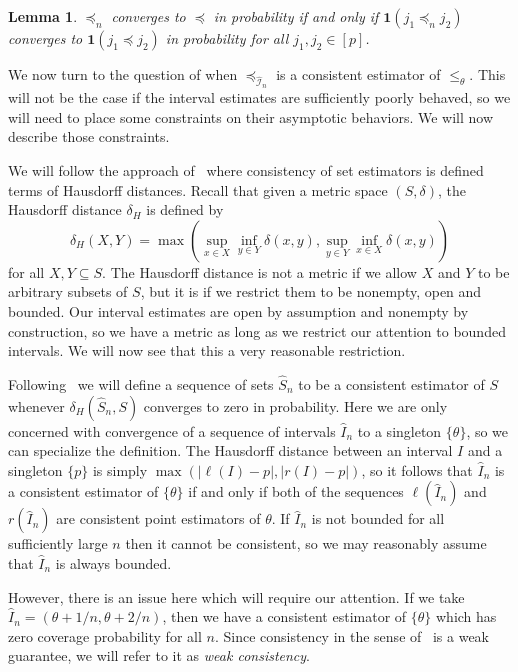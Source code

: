 \documentclass[12pt]{article}
\newcommand{\ind}[1]{\mathbf{1}(#1)}
\newcommand{\pord}{{\leqslant_{\theta}}}
\newcommand{\iordn}{{\preceq_{\hat{\mathcal{I}}_{n}}}}
\numberwithin{theorem}{section}
\newtheorem{lemma}[theorem]{Lemma}
\begin{document}
\begin{lemma}
\label{lem_ind_consist}
$\preceq_n$ converges to $\preceq$ in probability if and only if $\ind{j_1 \preceq_n j_2}$ converges to $\ind{j_1 \preceq j_2}$ in probability for all $j_1, j_2 \in [p]$.
\end{lemma}

We now turn to the question of when $\iordn$ is a consistent estimator of $\pord$.  This will not be the case if the interval estimates are sufficiently poorly behaved, so we will need to place some constraints on their asymptotic behaviors.  We will now describe those constraints.

We will follow the approach of~\cite{chernozhukov2007estimation} where consistency of set estimators is defined terms of Hausdorff distances.  Recall that given a metric space $(S, \delta)$, the Hausdorff distance $\delta_H$ is defined by \[\delta_H(X, Y) = \max\left(\sup_{x \in X} \inf_{y \in Y}\delta(x, y), \sup_{y \in Y} \inf_{x \in X}\delta(x, y)\right)\] for all $X, Y \subseteq S$.  The Hausdorff distance is not a metric if we allow $X$ and $Y$ to be arbitrary subsets of $S$, but it is if we restrict them to be nonempty, open and bounded.  Our interval estimates are open by assumption and nonempty by construction, so we have a metric as long as we restrict our attention to bounded intervals.  We will now see that this a very reasonable restriction.

Following~\cite{chernozhukov2007estimation} we will define a sequence of sets $\hat{S}_n$ to be a consistent estimator of $S$ whenever $\delta_H(\hat{S}_n, S)$ converges to zero in probability.  Here we are only concerned with convergence of a sequence of intervals $\hat{I}_n$ to a singleton $\{\theta\}$, so we can specialize the definition.  The Hausdorff distance between an interval $I$ and a singleton $\{p\}$ is simply $\max(|\ell(I) - p|, |r(I) - p|)$, so it follows that $\hat{I}_n$ is a consistent estimator of $\{\theta\}$ if and only if both of the sequences $\ell(\hat{I}_n)$ and $r(\hat{I}_n)$ are consistent point estimators of $\theta$.  If $\hat{I}_n$ is not bounded for all sufficiently large $n$ then it cannot be consistent, so we may reasonably assume that $\hat{I}_n$ is always bounded.

However, there is an issue here which will require our attention.  If we take $\hat{I}_n = (\theta + 1 / n, \theta + 2 / n)$, then we have a consistent estimator of $\{\theta\}$ which has zero coverage probability for all $n$.  Since consistency in the sense of~\cite{chernozhukov2007estimation} is a weak guarantee, we will refer to it as \emph{weak consistency}.
\end{document}

